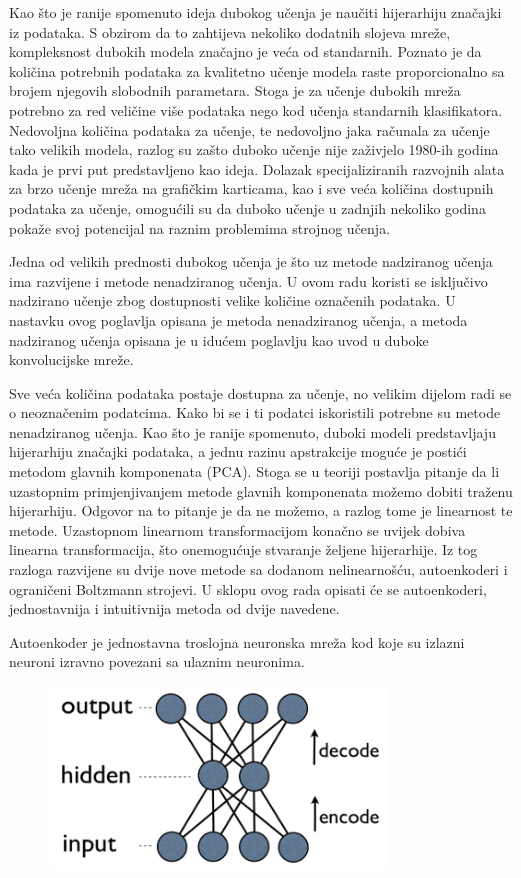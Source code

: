 \documentclass[lmodern, utf8, diplomski, numeric]{fer}
\begin{document}
Kao što je ranije spomenuto ideja dubokog učenja je naučiti hijerarhiju značajki iz podataka. S obzirom da to zahtijeva nekoliko dodatnih slojeva mreže, kompleksnost dubokih modela značajno je veća od standarnih. Poznato je da količina potrebnih podataka za kvalitetno učenje modela raste proporcionalno sa brojem njegovih slobodnih parametara. Stoga je za učenje dubokih mreža potrebno za red veličine više podataka nego kod učenja standarnih klasifikatora. Nedovoljna količina podataka za učenje, te nedovoljno jaka računala za učenje tako velikih modela, razlog su zašto duboko učenje nije zaživjelo 1980-ih godina kada je prvi put predstavljeno kao ideja. Dolazak specijaliziranih razvojnih alata za brzo učenje mreža na grafičkim karticama, kao i sve veća količina dostupnih podataka za učenje, omogućili su da duboko učenje u zadnjih nekoliko godina pokaže svoj potencijal na raznim problemima strojnog učenja.

Jedna od velikih prednosti dubokog učenja je što uz metode nadziranog učenja ima razvijene i metode nenadziranog učenja. U ovom radu koristi se isključivo nadzirano učenje zbog dostupnosti velike količine označenih podataka. U nastavku ovog poglavlja opisana je metoda nenadziranog učenja, a metoda nadziranog učenja opisana je u idućem poglavlju kao uvod u duboke konvolucijske mreže.

Sve veća količina podataka postaje dostupna za učenje, no velikim dijelom radi se o neoznačenim podatcima. Kako bi se i ti podatci iskoristili potrebne su metode nenadziranog učenja. Kao što je ranije spomenuto, duboki modeli predstavljaju hijerarhiju značajki podataka, a jednu razinu apstrakcije moguće je postići metodom glavnih komponenata (PCA). Stoga se u teoriji postavlja pitanje da li uzastopnim primjenjivanjem metode glavnih komponenata možemo dobiti traženu hijerarhiju. Odgovor na to pitanje je da ne možemo, a razlog tome je linearnost te metode. Uzastopnom linearnom transformacijom konačno se uvijek dobiva linearna transformacija, što onemogućuje stvaranje željene hijerarhije. Iz tog razloga razvijene su dvije nove metode sa dodanom nelinearnošću, autoenkoderi i ograničeni Boltzmann strojevi. U sklopu ovog rada opisati će se autoenkoderi, jednostavnija i intuitivnija metoda od dvije navedene.

Autoenkoder je jednostavna troslojna neuronska mreža kod koje su izlazni neuroni izravno povezani sa ulaznim neuronima. 

\begin{figure}[ht!]
\centering
\includegraphics[width=9cm]{slike/autoenkoder.png}
\caption{}
\end{figure}
\end{document}
